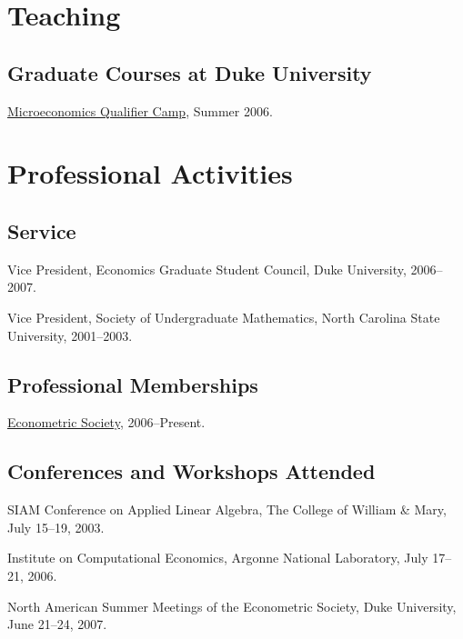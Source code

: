 \documentclass[letterpaper]{article}
\renewenvironment{itemize}{
  \begin{list}{}{
    \setlength{\leftmargin}{1em}
  }
}{
  \end{list}
}
\begin{document}
\section*{Teaching}

\subsection*{Graduate Courses at Duke University}

\begin{itemize}
\item \href{http://jblevins.org/courses/qualcamp06}{Microeconomics
    Qualifier Camp}, Summer 2006.
\end{itemize}


\section*{Professional Activities}

\subsection*{Service}

\begin{itemize}
\item Vice President, Economics Graduate Student Council, Duke University,
  2006--2007.
\item Vice President, Society of Undergraduate Mathematics, North
  Carolina State University, 2001--2003.
\end{itemize}

\subsection*{Professional Memberships}

\begin{itemize}
\item \href{http://www.econometricsociety.org/}{Econometric Society},
  2006--Present.
\end{itemize}

\subsection*{Conferences and Workshops Attended}

\begin{itemize}
\item SIAM Conference on Applied Linear Algebra,
  The College of William \& Mary,
  July 15--19, 2003.
\item Institute on Computational Economics,
  Argonne National Laboratory,
  July 17--21, 2006.
\item North American Summer Meetings of the Econometric Society,
  Duke University,
  June 21--24, 2007.
\end{itemize}
\end{document}
